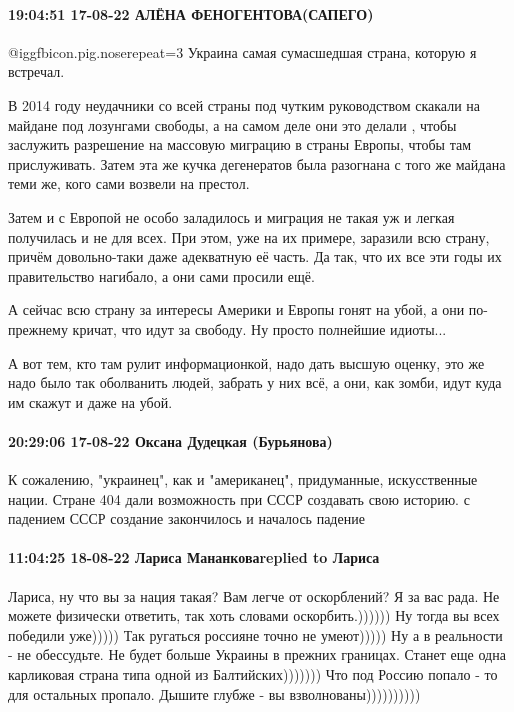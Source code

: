 \paragraph{19:04:51 17-08-22 АЛЁНА ФЕНОГЕНТОВА(САПЕГО)}

 @igg{fbicon.pig.nose}{repeat=3} Украина самая сумасшедшая страна, которую я встречал.

В 2014 году неудачники со всей страны под чутким руководством скакали на
майдане под лозунгами свободы, а на самом деле они это делали , чтобы заслужить
разрешение на массовую миграцию в страны Европы, чтобы там прислуживать. Затем
эта же кучка дегенератов была разогнана с того же майдана теми же, кого сами
возвели на престол.

Затем и с Европой не особо заладилось и миграция не такая уж и легкая
получилась и не для всех. При этом, уже на их примере, заразили всю страну,
причём довольно-таки даже адекватную её часть. Да так, что их все эти годы их
правительство нагибало, а они сами просили ещё.

А сейчас всю страну за интересы Америки и Европы гонят на убой, а они
по-прежнему кричат, что идут за свободу. Ну просто полнейшие идиоты...

А вот тем, кто там рулит информационкой, надо дать высшую оценку, это же надо
было так оболванить людей, забрать у них всё, а они, как зомби, идут куда им
скажут и даже на убой.

\paragraph{20:29:06 17-08-22 Оксана Дудецкая (Бурьянова)}

К сожалению, "украинец", как и "американец", придуманные, искусственные нации.
Стране 404 дали возможность при СССР создавать свою историю. с падением СССР
создание закончилось и началось падение

\paragraph{11:04:25 18-08-22 Лариса Мананковаreplied to Лариса}

Лариса, ну что вы за нация такая? Вам легче от оскорблений? Я за вас рада. Не
можете физически ответить, так хоть словами оскорбить.)))))) Ну тогда вы всех
победили уже))))) Так ругаться россияне точно не умеют))))) Ну а в реальности -
не обессудьте. Не будет больше Украины в прежних границах. Станет еще одна
карликовая страна типа одной из Балтийских))))))) Что под Россию попало - то
для остальных пропало. Дышите глубже - вы взволнованы))))))))))

